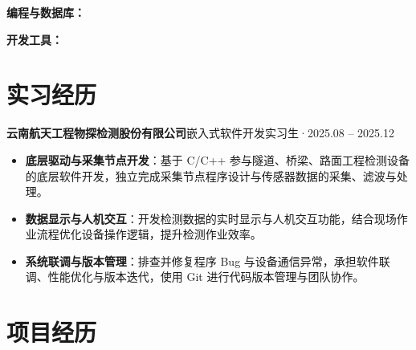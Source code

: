 \documentclass[10pt,a4paper]{article}
\begin{document}
\vspace{2pt}

{\bfseries\color{primary}编程与数据库：}

\vspace{2pt}

{\bfseries\color{primary}开发工具：}

\section{\faBriefcase\hspace{0.4em}实习经历}

{\bfseries 云南航天工程物探检测股份有限公司}\hfill{\color{graytext}嵌入式软件开发实习生\hspace{0.3em}·\hspace{0.3em}2025.08 -- 2025.12}

\vspace{2pt}

\begin{itemize}[leftmargin=1.5em, itemsep=2pt, parsep=0pt, topsep=2pt]
    \item \textbf{底层驱动与采集节点开发}：基于 C/C++ 参与隧道、桥梁、路面工程检测设备的底层软件开发，独立完成采集节点程序设计与传感器数据的采集、滤波与处理。
    \item \textbf{数据显示与人机交互}：开发检测数据的实时显示与人机交互功能，结合现场作业流程优化设备操作逻辑，提升检测作业效率。
    \item \textbf{系统联调与版本管理}：排查并修复程序 Bug 与设备通信异常，承担软件联调、性能优化与版本迭代，使用 Git 进行代码版本管理与团队协作。
\end{itemize}

\vspace{0.2em}

\section{\faProjectDiagram\hspace{0.4em}项目经历}
\end{document}
